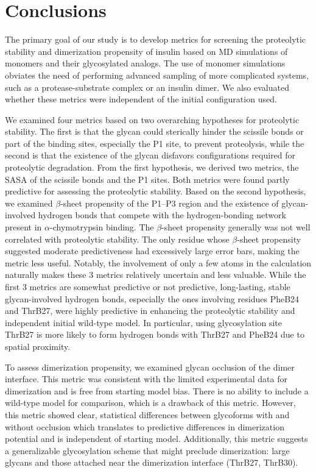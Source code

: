 \documentclass[9pt]{elife}
\begin{document}
\section{Conclusions}
The primary goal of our study is to develop metrics for screening the proteolytic stability and dimerization propensity of insulin based on MD simulations of monomers and their glycosylated analogs. The use of monomer simulations obviates the need of performing advanced sampling of more complicated systems, such as a protease-substrate complex or an insulin dimer. We also evaluated whether these metrics were independent of the initial configuration used. 

We examined four metrics based on two overarching hypotheses for proteolytic stability. The first is that the glycan could sterically hinder the scissile bonds or part of the binding sites, especially the P1 site, to prevent proteolysis, while the second is that the existence of the glycan disfavors configurations required for proteolytic degradation. From the first hypothesis, we derived two metrics, the SASA of the scissile bonds and the P1 sites. Both metrics were found partly predictive for assessing the proteolytic stability. Based on the second hypothesis, we examined $\beta$-sheet propensity of the P1--P3 region and the existence of glycan-involved hydrogen bonds that compete with the hydrogen-bonding network present in $\alpha$-chymotrypsin binding. The $\beta$-sheet propensity generally was not well correlated with proteolytic stability. The only residue whose $\beta$-sheet propensity suggested moderate predictiveness had excessively large error bars, making the metric less useful. Notably, the involvement of only a few atoms in the calculation naturally makes these 3 metrics relatively uncertain and less valuable. While the first 3 metrics are somewhat predictive or not predictive, long-lasting, stable glycan-involved hydrogen bonds, especially the ones involving residues PheB24 and ThrB27, were highly predictive in enhancing the proteolytic stability and independent initial wild-type model.  In particular, using glycosylation site ThrB27 is more likely to form hydrogen bonds with ThrB27 and PheB24 due to spatial proximity.

To assess dimerization propensity, we examined glycan occlusion of the dimer interface. This metric was consistent with the limited experimental data for dimerization and is free from starting model bias. There is no ability to include a wild-type model for comparison, which is a drawback of this metric. However, this metric showed clear, statistical differences between glycoforms with and without occlusion which translates to predictive differences in dimerization potential and is independent of starting model. Additionally, this metric suggests a generalizable glycosylation scheme that might preclude dimerization: large glycans and those attached near the dimerization interface (ThrB27, ThrB30). 
\end{document}
